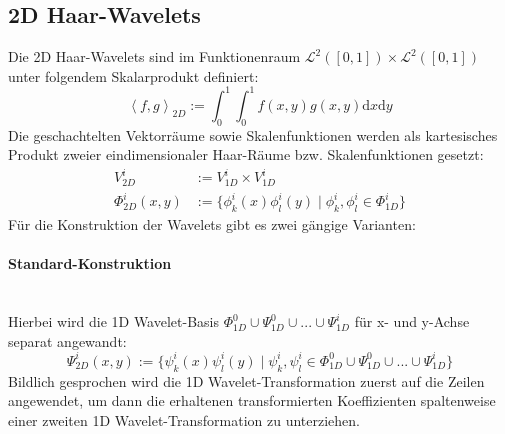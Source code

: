 \subsection{2D Haar-Wavelets}
Die 2D Haar-Wavelets sind im Funktionenraum $\mathcal{L}^2([0,1])\times\mathcal{L}^2([0,1])$ unter folgendem Skalarprodukt definiert:\begin{equation*}
	\left\langle f, g\right\rangle _{2D}:=\int_{0}^{1}\int_{0}^{1}f(x,y)g(x,y)\mathrm{d}x\mathrm{d}y
\end{equation*}
Die geschachtelten Vektorräume sowie Skalenfunktionen werden als kartesisches Produkt zweier eindimensionaler Haar-Räume bzw. Skalenfunktionen gesetzt:\begin{align*}
	V^i_{2D}&:= V^i_{1D}\times V^i_{1D}\\
	\Phi^i_{2D}(x, y)&:=\{\phi^i_k(x)\phi^i_l(y)\mid \phi^i_k, \phi^i_l\in\Phi^i_{1D} \}
\end{align*}
Für die Konstruktion der Wavelets gibt es zwei gängige Varianten:
\paragraph{Standard-Konstruktion}~\\
Hierbei wird die 1D Wavelet-Basis $\Phi_{1D}^0\cup\Psi_{1D}^0\cup...\cup\Psi_{1D}^{i}$ für x- und y-Achse separat angewandt:\begin{equation*}
	\Psi^i_{2D}(x, y):=\{\psi^i_k(x)\psi^i_l(y)\mid \psi^i_k,\psi^i_l\in\Phi_{1D}^0\cup\Psi_{1D}^0\cup...\cup\Psi_{1D}^{i} \}
\end{equation*}Bildlich gesprochen wird die 1D Wavelet-Transformation zuerst auf die Zeilen angewendet, um dann die erhaltenen transformierten Koeffizienten spaltenweise einer zweiten 1D Wavelet-Transformation zu unterziehen.
